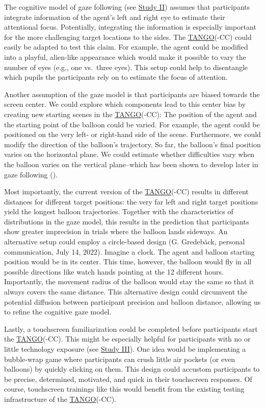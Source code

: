 \documentclass[
]{scrbook}
\begin{document}
The cognitive model of gaze following (see \hyperref[studyII]{Study II}) assumes that participants integrate information of the agent's left and right eye to estimate their attentional focus. Potentially, integrating the information is especially important for the more challenging target locations to the sides. The \hyperref[acronyms_TANGO]{TANGO}(-CC) could easily be adapted to test this claim. For example, the agent could be modified into a playful, alien-like appearance which would make it possible to vary the number of eyes (e.g., one vs.~three eyes). This setup could help to disentangle which pupils the participants rely on to estimate the focus of attention.

Another assumption of the gaze model is that participants are biased towards the screen center. We could explore which components lead to this center bias by creating new starting scenes in the \hyperref[acronyms_TANGO]{TANGO}(-CC): The position of the agent and the starting point of the balloon could be varied. For example, the agent could be positioned on the very left- or right-hand side of the scene. Furthermore, we could modify the direction of the balloon's trajectory. So far, the balloon's final position varies on the horizontal plane. We could estimate whether difficulties vary when the balloon varies on the vertical plane\thinspace --\thinspace which has been shown to develop later in gaze following ().

Most importantly, the current version of the \hyperref[acronyms_TANGO]{TANGO}(-CC) results in different distances for different target positions: the very far left and right target positions yield the longest balloon trajectories. Together with the characteristics of distributions in the gaze model, this results in the prediction that participants show greater imprecision in trials where the balloon lands sideways. An alternative setup could employ a circle-based design (G. Gredebäck, personal communication, July 14, 2022). Imagine a clock. The agent and balloon starting position would be in its center. This time, however, the balloon would fly in all possible directions like watch hands pointing at the 12 different hours. Importantly, the movement radius of the balloon would stay the same so that it always covers the same distance. This alternative design could circumvent the potential diffusion between participant precision and balloon distance, allowing us to refine the cognitive gaze model.

Lastly, a touchscreen familiarization could be completed before participants start the \hyperref[acronyms_TANGO]{TANGO}(-CC). This might be especially helpful for participants with no or little technology exposure (see \hyperref[studyIII]{Study III}). One idea would be implementing a bubble-wrap game where participants can crush little air pockets (or even balloons) by quickly clicking on them. This design could accustom participants to be precise, determined, motivated, and quick in their touchscreen responses. Of course, touchscreen trainings like this would benefit from the existing testing infrastructure of the \hyperref[acronyms_TANGO]{TANGO}(-CC).
\end{document}
